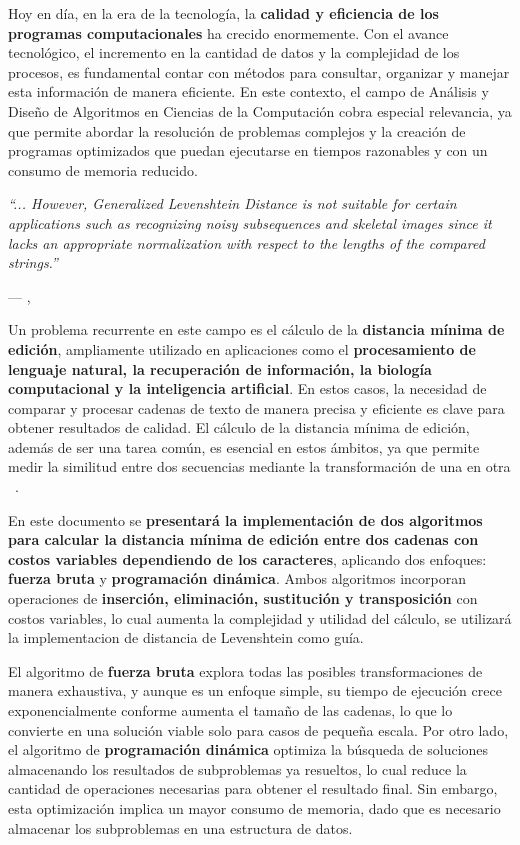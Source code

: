 Hoy en día, en la era de la tecnología, la \textbf{calidad y eficiencia de los programas computacionales} ha crecido enormemente. Con el avance tecnológico, el incremento en la cantidad de datos y la complejidad de los procesos, es fundamental contar con métodos para consultar, organizar y manejar esta información de manera eficiente. En este contexto, el campo de Análisis y Diseño de Algoritmos en Ciencias de la Computación cobra especial relevancia, ya que permite abordar la resolución de problemas complejos y la creación de programas optimizados que puedan ejecutarse en tiempos razonables y con un consumo de memoria reducido.

\epigraph{\textit{``... However, Generalized Levenshtein Distance  is not suitable for certain applications such as recognizing noisy subsequences and skeletal images since it lacks an appropriate normalization with respect to the lengths of the compared strings.''}}{--- \citeauthor{yujian2007normalized}, \citeyear{yujian2007normalized} \cite{yujian2007normalized}}

Un problema recurrente en este campo es el cálculo de la \textbf{distancia mínima de edición}, ampliamente utilizado en aplicaciones como el \textbf{procesamiento de lenguaje natural, la recuperación de información, la biología computacional y la inteligencia artificial}. En estos casos, la necesidad de comparar y procesar cadenas de texto de manera precisa y eficiente es clave para obtener resultados de calidad. El cálculo de la distancia mínima de edición, además de ser una tarea común, es esencial en estos ámbitos, ya que permite medir la similitud entre dos secuencias mediante la transformación de una en otra ~\cite{yujian2007normalized,moyotl2016metodo}.

En este documento se \textbf{presentará la implementación de dos algoritmos para calcular la distancia mínima de edición entre dos cadenas con costos variables dependiendo de los caracteres}, aplicando dos enfoques: \textbf{fuerza bruta} y \textbf{programación dinámica}. Ambos algoritmos incorporan operaciones de \textbf{inserción, eliminación, sustitución y transposición} con costos variables, lo cual aumenta la complejidad y utilidad del cálculo, se utilizará la implementacion de distancia de Levenshtein como guía.

El algoritmo de \textbf{fuerza bruta} explora todas las posibles transformaciones de manera exhaustiva, y aunque es un enfoque simple, su tiempo de ejecución crece exponencialmente conforme aumenta el tamaño de las cadenas, lo que lo convierte en una solución viable solo para casos de pequeña escala. Por otro lado, el algoritmo de \textbf{programación dinámica} optimiza la búsqueda de soluciones almacenando los resultados de subproblemas ya resueltos, lo cual reduce la cantidad de operaciones necesarias para obtener el resultado final. Sin embargo, esta optimización implica un mayor consumo de memoria, dado que es necesario almacenar los subproblemas en una estructura de datos.

